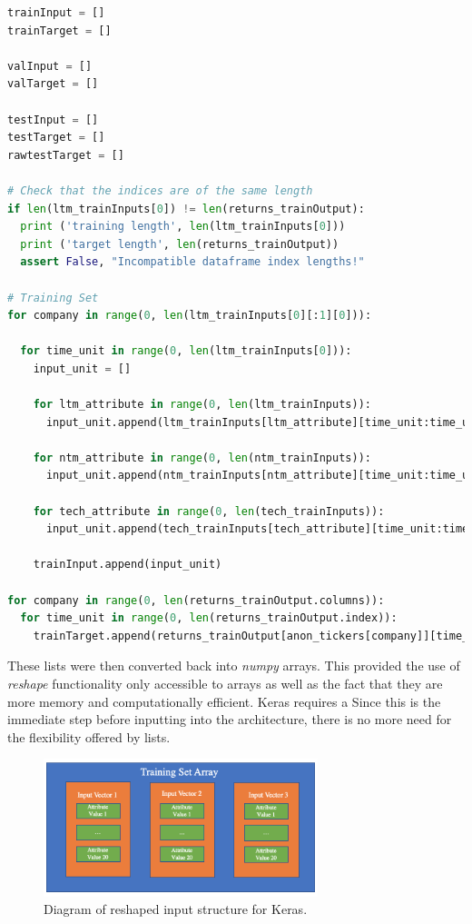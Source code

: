 \documentclass[10pt,onecolumn,letterpaper]{article}
\begin{document}
\begin{lstlisting}[language=Python, breaklines=true, caption={Formation of the input vectors for the model.}]
trainInput = []
trainTarget = []

valInput = []
valTarget = []

testInput = []
testTarget = []
rawtestTarget = []

# Check that the indices are of the same length 
if len(ltm_trainInputs[0]) != len(returns_trainOutput):
  print ('training length', len(ltm_trainInputs[0]))
  print ('target length', len(returns_trainOutput))
  assert False, "Incompatible dataframe index lengths!"

# Training Set
for company in range(0, len(ltm_trainInputs[0][:1][0])):
  
  for time_unit in range(0, len(ltm_trainInputs[0])): 
    input_unit = []
    
    for ltm_attribute in range(0, len(ltm_trainInputs)): 
      input_unit.append(ltm_trainInputs[ltm_attribute][time_unit:time_unit+1][0][company])
                        
    for ntm_attribute in range(0, len(ntm_trainInputs)):
      input_unit.append(ntm_trainInputs[ntm_attribute][time_unit:time_unit+1][0][company])
                        
    for tech_attribute in range(0, len(tech_trainInputs)): 
      input_unit.append(tech_trainInputs[tech_attribute][time_unit:time_unit+1][0][company])
                        
    trainInput.append(input_unit)
    
for company in range(0, len(returns_trainOutput.columns)):
  for time_unit in range(0, len(returns_trainOutput.index)): 
    trainTarget.append(returns_trainOutput[anon_tickers[company]][time_unit])
\end{lstlisting} 

These lists were then converted back into \textit{numpy} arrays. This provided the use of \textit{reshape} functionality only accessible to arrays as well as the fact that they are more memory and computationally efficient. Keras requires a Since this is the immediate step before inputting into the architecture, there is no more need for the flexibility offered by lists. 

\begin{figure}[!hbt!]
\centering
\includegraphics[width=8cm]{input_structure.png}
\caption{Diagram of reshaped input structure for Keras.}
\end{figure}
\end{document}
